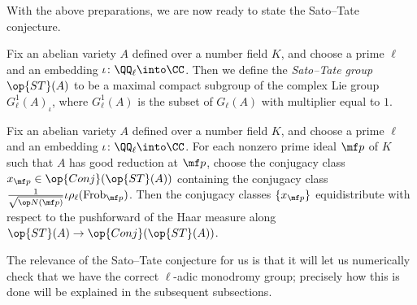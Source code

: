 \documentclass[../thesis.tex]{subfiles}
\begin{document}
With the above preparations, we are now ready to state the Sato--Tate conjecture.
\begin{definition}
	Fix an abelian variety $A$ defined over a number field $K$, and choose a prime $\ell$ and an embedding $\iota\colon\QQ_\ell\into\CC$. Then we define the \textit{Sato--Tate group} $\op{ST}(A)$ to be a maximal compact subgroup of the complex Lie group $G_\ell^1(A)_\iota$, where $G_\ell^1(A)$ is the subset of $G_\ell(A)$ with multiplier equal to $1$.
\end{definition}
\begin{conj} \label{conj:st}
	Fix an abelian variety $A$ defined over a number field $K$, and choose a prime $\ell$ and an embedding $\iota\colon\QQ_\ell\into\CC$. For each nonzero prime ideal $\mf p$ of $K$ such that $A$ has good reduction at $\mf p$, choose the conjugacy class $x_{\mf p}\in\op{Conj}(\op{ST}(A))$ containing the conjugacy class $\frac1{\sqrt{\op N(\mf p)}}\iota\rho_\ell(\mathrm{Frob}_{\mf p})$. Then the conjugacy classes $\{x_{\mf p}\}$ equidistribute with respect to the pushforward of the Haar measure along $\op{ST}(A)\to\op{Conj}(\op{ST}(A))$.
\end{conj}
The relevance of the Sato--Tate conjecture for us is that it will let us numerically check that we have the correct $\ell$-adic monodromy group; precisely how this is done will be explained in the subsequent subsections.
\end{document}
